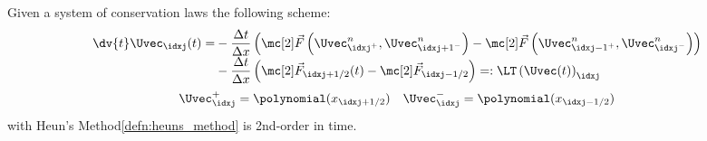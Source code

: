 \begin{propositionbox}\nospacing
    \begin{proposition}\label{proposition:heun's_method_for_systems_of_conservation_laws}
        Given a system of conservation laws the following scheme:
        \begin{align*}
          \dv{t}\Uvec_{\idxj}(t)=&-\frac{\Delta t}{\Delta x}
          \left(\Fluxvec\left(\Uvec_{\idxj^{+}}^{n},\Uvec_{{\idxj+1}^{-}}^{n}\right)-
         \Fluxvec \left(\Uvec_{{\idxj-1}^{+}}^{n},\Uvec_{{\idxj}^{-}}^{n}\right) \right)\\[-1\jot]
          &-\frac{\Delta t}{\Delta x}
          \left(\Fluxvec_{\idxj+1/2}(t)-
         \Fluxvec_{\idxj-1/2}\right)=:\LT \left(\Uvec(t)\right)_{\idxj}
        \end{align*}
        \begin{align*}
          \Uvec_{\idxj}^{+}=\polynomial(x_{\idxj+1/2})&&\Uvec_{\idxj}^{-}=\polynomial(x_{\idxj-1/2})
        \end{align*}
        with Heun's Method\cref{defn:heuns_method} is 2nd-order in time.
    \end{proposition}
\end{propositionbox}

